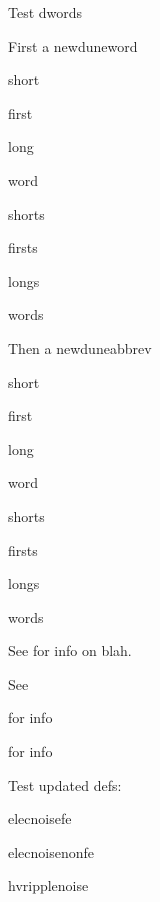 \documentclass{dune}
\begin{document}
%





Test dwords

First a newduneword

short 

first 

long 

word 

shorts 

firsts 

longs 

words 

Then a newduneabbrev

short 

first 

long 

word 

shorts 

firsts 

longs 

words 





See \tcches for info on blah. 

See \tcchproj 

\tcchjpo for info

\tcchdesorg for info

\tcchie

\introchtc


\physchndk

\spchtpcelec

\dpchcalib

\tcchrev

\cleardoublepage

Test updated defs:

elecnoisefe \elecnoisefe

elecnoisenonfe \elecnoisenonfe

hvripplenoise \hvripplenoise


\end{document}
